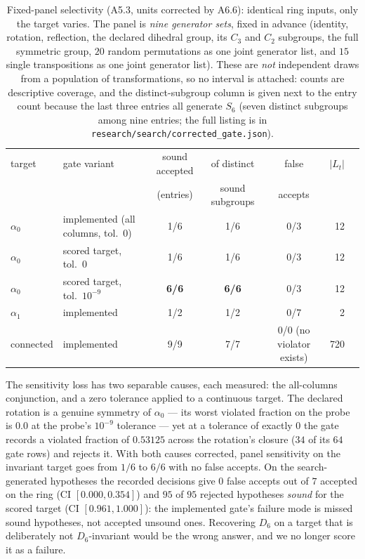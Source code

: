 \documentclass{neurips_2024}
\begin{document}
\begin{table}[t]
\centering
\caption{Fixed-panel selectivity (A5.3, units corrected by A6.6): identical ring
inputs, only the target varies. The panel is \emph{nine generator sets}, fixed in advance
(identity, rotation, reflection, the declared dihedral group, its $C_3$ and $C_2$ subgroups,
the full symmetric group, $20$ random permutations as one joint generator list, and $15$ single
transpositions as one joint generator list). These are \emph{not} independent draws from a
population of transformations, so no interval is attached: counts are descriptive coverage, and
the distinct-subgroup column is given next to the entry count because the last three entries all
generate $S_6$ (seven distinct subgroups among nine entries; the full listing is in
\texttt{research/search/corrected\_gate.json}).}
\label{tab:panel}
\small
\begin{tabular}{@{}llcccrr@{}}
\toprule
target & gate variant & sound accepted & of distinct & false & $|L_t|$ \\
 & & (entries) & sound subgroups & accepts & \\
\midrule
$\alpha_0$ & implemented (all columns, tol.\ $0$) & 1/6 & 1/6 & 0/3 & 12 \\
$\alpha_0$ & scored target, tol.\ $0$ & 1/6 & 1/6 & 0/3 & 12 \\
$\alpha_0$ & scored target, tol.\ $10^{-9}$ & \textbf{6/6} & \textbf{6/6} & 0/3 & 12 \\
$\alpha_1$ & implemented & 1/2 & 1/2 & 0/7 & 2 \\
connected & implemented & 9/9 & 7/7 & 0/0 (no violator exists) & 720 \\
\bottomrule
\end{tabular}
\end{table}

The sensitivity loss has two separable causes, each measured: the all-columns conjunction,
and a zero tolerance applied to a continuous target. The declared rotation is a genuine
symmetry of $\alpha_0$ --- its worst violated fraction on the probe is $0.0$ at the probe's
$10^{-9}$ tolerance --- yet at a tolerance of exactly $0$ the gate records a violated fraction
of $0.53125$ across the rotation's closure ($34$ of its $64$ gate rows) and rejects it. With
both causes corrected, panel sensitivity on the invariant target goes from $1/6$ to $6/6$
with no false accepts. On the search-generated hypotheses the recorded decisions give
$0$ false accepts out of $7$ accepted on the ring (CI $[0.000,0.354]$) and $95$ of $95$
rejected hypotheses \emph{sound} for the scored target (CI $[0.961,1.000]$): the implemented
gate's failure mode is missed sound hypotheses, not accepted unsound ones. Recovering $D_6$
on a target that is deliberately not $D_6$-invariant would be the wrong answer, and we no
longer score it as a failure.
\end{document}
